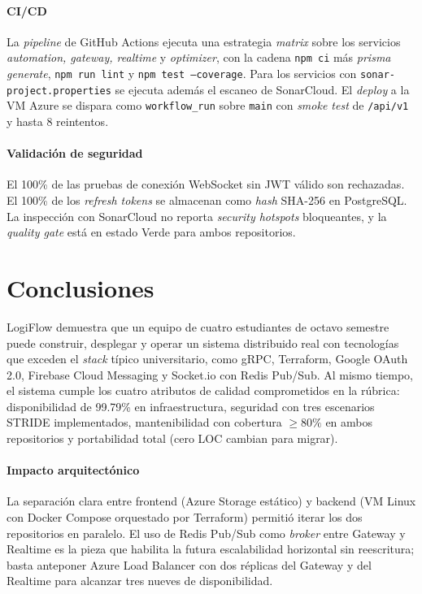 \documentclass[conference]{IEEEtran}
\begin{document}
\paragraph{CI/CD} La \emph{pipeline} de GitHub Actions ejecuta una estrategia \emph{matrix} sobre los servicios \emph{automation, gateway, realtime} y \emph{optimizer}, con la cadena \texttt{npm ci} m\'as \emph{prisma generate}, \texttt{npm run lint} y \texttt{npm test --coverage}. Para los servicios con \texttt{sonar-project.properties} se ejecuta adem\'as el escaneo de SonarCloud. El \emph{deploy} a la VM Azure se dispara como \texttt{workflow\_run} sobre \texttt{main} con \emph{smoke test} de \texttt{/api/v1} y hasta 8 reintentos.

\paragraph{Validaci\'on de seguridad} El 100\% de las pruebas de conexi\'on WebSocket sin JWT v\'alido son rechazadas. El 100\% de los \emph{refresh tokens} se almacenan como \emph{hash} SHA-256 en PostgreSQL. La inspecci\'on con SonarCloud no reporta \emph{security hotspots} bloqueantes, y la \emph{quality gate} est\'a en estado Verde para ambos repositorios.

\section{Conclusiones}
\label{sec:conclusiones}

LogiFlow demuestra que un equipo de cuatro estudiantes de octavo semestre puede construir, desplegar y operar un sistema distribuido real con tecnolog\'ias que exceden el \emph{stack} t\'ipico universitario, como gRPC, Terraform, Google OAuth 2.0, Firebase Cloud Messaging y Socket.io con Redis Pub/Sub. Al mismo tiempo, el sistema cumple los cuatro atributos de calidad comprometidos en la r\'ubrica: disponibilidad de 99.79\% en infraestructura, seguridad con tres escenarios STRIDE implementados, mantenibilidad con cobertura $\geq 80\%$ en ambos repositorios y portabilidad total (cero LOC cambian para migrar).

\paragraph{Impacto arquitect\'onico} La separaci\'on clara entre frontend (Azure Storage est\'atico) y backend (VM Linux con Docker Compose orquestado por Terraform) permiti\'o iterar los dos repositorios en paralelo. El uso de Redis Pub/Sub como \emph{broker} entre Gateway y Realtime es la pieza que habilita la futura escalabilidad horizontal sin reescritura; basta anteponer Azure Load Balancer con dos r\'eplicas del Gateway y del Realtime para alcanzar tres nueves de disponibilidad.
\end{document}
